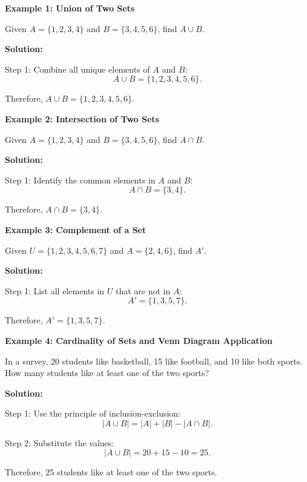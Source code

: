 \begin{flushleft}
\textbf{Example 1: Union of Two Sets}

Given $A = \{1, 2, 3, 4\}$ and $B = \{3, 4, 5, 6\}$, find $A \cup B$.

\vspace{0.5cm}
\textbf{Solution:}
\vspace{0.5cm}

Step 1: Combine all unique elements of $A$ and $B$:
\[
A \cup B = \{1, 2, 3, 4, 5, 6\}.
\]

Therefore, $A \cup B = \{1, 2, 3, 4, 5, 6\}$.

\vspace{1cm}
\textbf{Example 2: Intersection of Two Sets}

Given $A = \{1, 2, 3, 4\}$ and $B = \{3, 4, 5, 6\}$, find $A \cap B$.

\vspace{0.5cm}
\textbf{Solution:}
\vspace{0.5cm}

Step 1: Identify the common elements in $A$ and $B$:
\[
A \cap B = \{3, 4\}.
\]

Therefore, $A \cap B = \{3, 4\}$.
\end{flushleft}

\begin{flushleft}
\textbf{Example 3: Complement of a Set}

Given $U = \{1, 2, 3, 4, 5, 6, 7\}$ and $A = \{2, 4, 6\}$, find $A'$.

\vspace{0.5cm}
\textbf{Solution:}
\vspace{0.5cm}

Step 1: List all elements in $U$ that are not in $A$:
\[
A' = \{1, 3, 5, 7\}.
\]

Therefore, $A' = \{1, 3, 5, 7\}$.
\end{flushleft}

\begin{flushleft}
\textbf{Example 4: Cardinality of Sets and Venn Diagram Application}

In a survey, 20 students like basketball, 15 like football, and 10 like both sports. How many students like at least one of the two sports?

\vspace{0.5cm}
\textbf{Solution:}
\vspace{0.5cm}

Step 1: Use the principle of inclusion-exclusion:
\[
|A \cup B| = |A| + |B| - |A \cap B|.
\]

Step 2: Substitute the values:
\[
|A \cup B| = 20 + 15 - 10 = 25.
\]

Therefore, 25 students like at least one of the two sports.
\end{flushleft}

